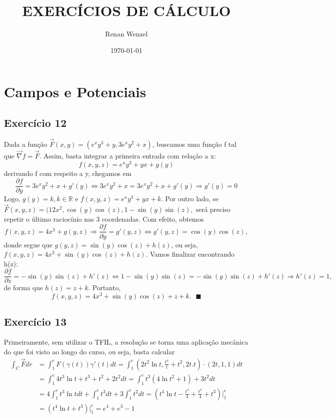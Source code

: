 \documentclass{article}
\title{EXERC\'ICIOS DE C\'ALCULO}
\author{Renan Wenzel}
\date{\today}
\renewcommand\qedsymbol{$\blacksquare$}
\begin{document}
\maketitle

\section*{Campos e Potenciais}
\subsection{Exerc\'icio 12}
Dada a fun\c c\~ao $\vec{F}(x, y) = (e^{x}y ^{3} + y, 3e^{x}y^2 + x)$, buscamos uma fun\c c\~ao f tal que 
$\vec{\nabla}{f} = \vec{F}$. Assim, basta integrar a primeira entrada com rela\c c\~ao a x:
  $$
  f(x, y, z) = e^{x}y^{3} + yx + g(y)
  $$
derivando f com respeito a y, chegamos em 
  $$
  \frac{\partial{f}}{\partial{y}} = 3e^{x}y^{2} + x + g'(y)\Longleftrightarrow 3e^{x}y^{2} + x = 3e^{x}y^{2} + x + g'(y)\Rightarrow g'(y) = 0
  $$
Logo, $g(y) = k, k\in\mathbb{R}$ e $f(x, y, z) = e^{x}y^{3} + yx + k$.
  Por outro lado, se $\vec{F}(x, y, z) = (12x^2, \cos(y)\cos(z), 1 - \sin(y)\sin(z),$ ser\'a preciso repetir o \'ultimo racioc\'inio 
nas 3 coordenadas. Com efeito, obtemos
  $$
  f(x, y, z) = 4x^{3} + g(y, z)\Rightarrow \frac{\partial{f}}{\partial{y}} = g'(y, z)\Longleftrightarrow g'(y, z) = \cos(y)\cos(z),
  $$
donde segue que $g(y, z) = \sin(y)\cos(z) + h(z)$, ou seja, $f(x, y, z) = 4x^{3} + \sin(y)\cos(z) + h(z)$. Vamos finalizar encontrando h(z):
  $$
  \frac{\partial{f}}{\partial{z}} = -\sin(y)\sin(z) + h'(z)\Longleftrightarrow 1 - \sin(y)\sin(z) = -\sin(y)\sin(z) + h'(z)\Rightarrow h'(z) = 1,
  $$
de forma que $h(z) = z + k$. Portanto, 
  $$
  f(x, y, z) = 4x^{3} + \sin(y)\cos(z) + z + k. \text{    \qedsymbol}
  $$

\subsection{Exerc\'icio 13}
Primeiramente, sem utilizar o TFIL, a resolu\c c\~ao se torna uma aplica\c c\~ao mec\^anica do que foi visto ao longo
do curso, ou seja, basta calcular
\begin{align*}
  \int_{C}\vec{F}\dot{}dr & = \int_{1}^{e} F(\gamma(t))\gamma'(t)dt = \int_{1}^{e}(2t^2\ln{t}, \frac{t ^{4}}{t} + t ^{2}, 2t.t)\cdot{}
  (2t, 1, 1)dt \\ 
  & =\int_{1}^{e}4t^3\ln{t} + t^3 + t^2 + 2t^2dt = \int_{1}^{e}t^3(4\ln{t^2} + 1) + 3t^2dt\\
  & =4\int_{1}^{e}t^3\ln{t}dt + \int_{1}^{e}t^3dt + 3\int_{1}^{e}t^2dt = (t^4\ln{t} - \frac{t^4}{4} + \frac{t ^{4}}{4} + t^3)\bigg|_{1}^{e} \\
  & =(t^4\ln{t} + t^3)\bigg|_{1}^{e} = e^{4} + e^{3} - 1 
\end{align*}
\end{document}
